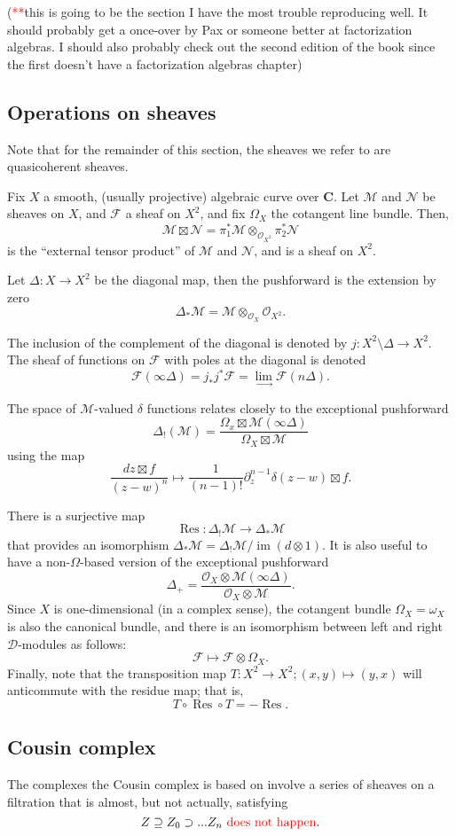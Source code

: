 \documentclass{article}
\newcommand{\CC}{\mathbold{C}}
\newcommand{\Oo}{\mathcal{O}}
\newcommand{\Dd}{\mathcal{D}}
\newcommand{\Ff}{\mathcal{F}}
\newcommand{\Mm}{\mathcal{M}}
\newcommand{\Nn}{\mathcal{N}}
\newcommand{\tk}{\textcolor{red}{*}}
\DeclareMathOperator{\Res}{Res}
\DeclareMathOperator{\im}{im}
\begin{document}
(\tk \tk this is going to be the section I have the most trouble reproducing well.  It should probably get a once-over by Pax or someone better at factorization algebras.  I should also probably check out the second edition of the book since the first doesn't have a factorization algebras chapter)

\subsection{Operations on sheaves}
Note that for the remainder of this section, the sheaves we refer to are quasicoherent sheaves.

Fix $X$ a smooth, (usually projective) algebraic curve over $\CC$.  Let $\Mm$ and $\Nn$ be sheaves on $X$, and $\Ff$ a sheaf on $X^2$, and fix $\Omega_X$ the cotangent line bundle.  Then,
\[\Mm \boxtimes \Nn = \pi_1^* \Mm \otimes_{\Oo_{X^2}} \pi_2^* \Nn \]
is the ``external tensor product'' of $\Mm$ and $\Nn$, and is a sheaf on $X^2$.

Let $\Delta: X \rightarrow X^2$ be the diagonal map, then the pushforward is the extension by zero
\[\Delta_*\Mm=\Mm \otimes_{\Oo_X} \Oo_{X^2}. \]

The inclusion of the complement of the diagonal is denoted by $j : X^2 \setminus \Delta \rightarrow X^2$.  The sheaf of functions on $\Ff$ with poles at the diagonal is denoted
\[\Ff(\infty \Delta) = j_*j^*\Ff = \lim_\rightarrow \Ff(n\Delta). \]

The space of $\Mm$-valued $\delta$ functions relates closely to the exceptional pushforward
\[\Delta_!(\Mm)=\frac{\Omega_x \boxtimes \Mm (\infty \Delta)}{\Omega_X \boxtimes \Mm} \]
using the map
\[\frac{dz \boxtimes f}{(z-w)^n} \mapsto \frac{1}{(n-1)!} \partial^{n-1}_z \delta(z-w) \boxtimes f. \]

There is a surjective map
\[\Res: \Delta_!\Mm \rightarrow \Delta_*\Mm \]
that provides an isomorphism $\Delta_*\Mm=\Delta_!\Mm/\im(d \otimes 1)$.  It is also useful to have a non-$\Omega$-based version of the exceptional pushforward
\[\Delta_+=\frac{\Oo_X \otimes \Mm(\infty \Delta)}{\Oo_X \otimes \Mm}. \]
Since $X$ is one-dimensional (in a complex sense), the cotangent bundle $\Omega_X = \omega_X$ is also the canonical bundle, and there is an isomorphism between left and right $\Dd$-modules as follows:
\[\Ff \mapsto \Ff \otimes \Omega_X. \]
Finally, note that the transposition map $T: X^2 \rightarrow X^2; (x,y) \mapsto (y,x)$ will anticommute with the residue map; that is,
\[T \circ \Res \circ T = - \Res. \]
\subsection{Cousin complex}
The complexes the Cousin complex is based on involve a series of sheaves on a filtration that is almost, but not actually, satisfying
\[Z \supseteq Z_0 \supset ... Z_n \textrm{ \textcolor{red}{does not happen}.} \]
\end{document}
